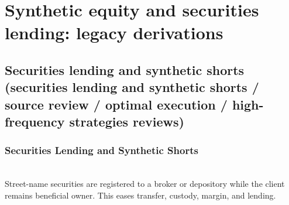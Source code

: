 \documentclass[a4paper,oneside,openany]{book}
\begin{document}
\chapter*{Synthetic equity and securities lending: legacy derivations}

\section*{Securities lending and synthetic shorts (securities lending and synthetic shorts / source review / optimal execution / high-frequency strategies reviews)}

\subsection*{Securities Lending and Synthetic Shorts}

\begin{definition} \\
Street-name securities are registered to a broker or depository while the client remains beneficial owner. This eases transfer, custody, margin, and lending.
\end{definition}
\end{document}
